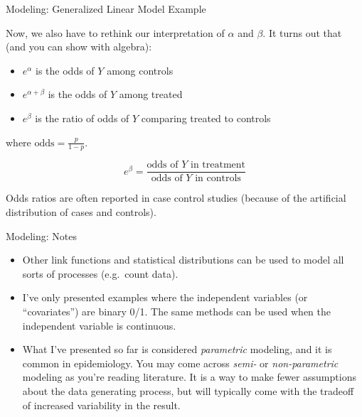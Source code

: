 \documentclass[ignorenonframetext,]{beamer}
\providecommand{\tightlist}{%
  \setlength{\itemsep}{0pt}\setlength{\parskip}{0pt}}
\begin{document}
\begin{frame}{Modeling: Generalized Linear Model Example}
\protect\hypertarget{modeling-generalized-linear-model-example}{}

Now, we also have to rethink our interpretation of \(\alpha\) and
\(\beta\). It turns out that (and you can show with algebra):

\begin{itemize}
\tightlist
\item
  \(e^{\alpha}\) is the odds of \(Y\) among controls
\item
  \(e^{\alpha + \beta}\) is the odds of \(Y\) among treated
\item
  \(e^{\beta}\) is the ratio of odds of \(Y\) comparing treated to
  controls
\end{itemize}

where \(\text{odds} = \frac{p}{1 - p}\).

\[
e^{\beta} = \frac{\text{odds of } Y \text{ in treatment}}{\text{odds of } Y \text{ in controls}}
\]

Odds ratios are often reported in case control studies (because of the
artificial distribution of cases and controls).

\end{frame}

\begin{frame}{Modeling: Notes}
\protect\hypertarget{modeling-notes}{}

\begin{itemize}
\tightlist
\item
  Other link functions and statistical distributions can be used to
  model all sorts of processes (e.g.~count data).
\item
  I've only presented examples where the independent variables (or
  ``covariates'') are binary 0/1. The same methods can be used when the
  independent variable is continuous.
\item
  What I've presented so far is considered \emph{parametric} modeling,
  and it is common in epidemiology. You may come across \emph{semi-} or
  \emph{non-parametric} modeling as you're reading literature. It is a
  way to make fewer assumptions about the data generating process, but
  will typically come with the tradeoff of increased variability in the
  result.
\end{itemize}

\end{frame}
\end{document}
